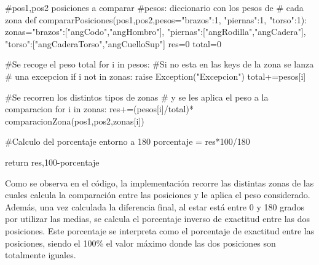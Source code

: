 {\begin{python}
#pos1,pos2 posiciones a comparar
#pesos: diccionario con los pesos de
# cada zona
def compararPosiciones(pos1,pos2,pesos={"brazos":1,
										"piernas":1,
										"torso":1}):
    zonas={"brazos":["angCodo","angHombro"],
    	  "piernas":["angRodilla","angCadera"],
    	  "torso":["angCaderaTorso","angCuelloSup"]}
    res=0
    total=0
    
    #Se recoge el peso total
    for i in pesos:
    	#Si no esta en las keys de la zona se lanza
    	# una excepcion
        if i not in zonas:
            raise Exception("Excepcion")
        total+=pesos[i]
        
    #Se recorren los distintos tipos de zonas
    # y se les aplica el peso a la comparacion
    for i in zonas:
        res+=(pesos[i]/total)*
        	 comparacionZona(pos1,pos2,zonas[i])

	#Calculo del porcentaje entorno a 180
    porcentaje = res*100/180
 
    return res,100-porcentaje
\end{python}

Como se observa en el código, la implementación recorre las distintas zonas de las cuales calcula la comparación entre las posiciones y le aplica el peso considerado. Además, una vez calculada la diferencia final, al estar está entre 0 y 180 grados por utilizar las medias, se calcula el porcentaje inverso de exactitud entre las dos posiciones. Este porcentaje se interpreta como el porcentaje de exactitud entre las posiciones, siendo el 100\% el valor máximo donde las dos posiciones son totalmente iguales.

}
